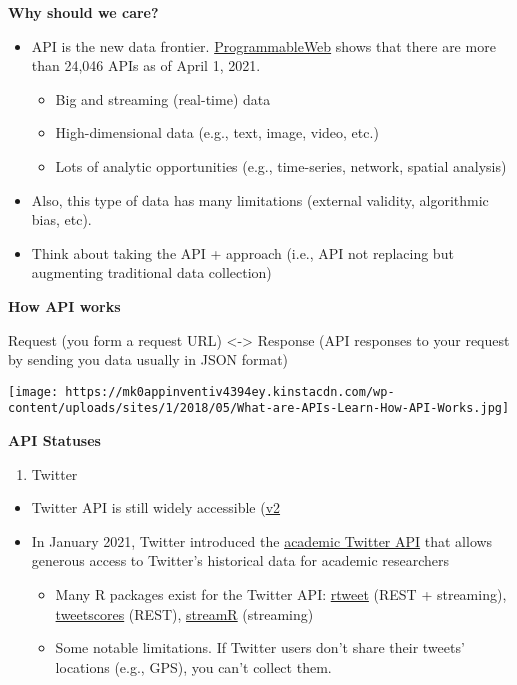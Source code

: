 \documentclass[
]{book}
\providecommand{\tightlist}{%
  \setlength{\itemsep}{0pt}\setlength{\parskip}{0pt}}
\begin{document}
\textbf{Why should we care?}

\begin{itemize}
\item
  API is the new data frontier. \href{https://www.programmableweb.com/apis/directory}{ProgrammableWeb} shows that there are more than 24,046 APIs as of April 1, 2021.

  \begin{itemize}
  \item
    Big and streaming (real-time) data
  \item
    High-dimensional data (e.g., text, image, video, etc.)
  \item
    Lots of analytic opportunities (e.g., time-series, network, spatial analysis)
  \end{itemize}
\item
  Also, this type of data has many limitations (external validity, algorithmic bias, etc).
\item
  Think about taking the API + approach (i.e., API not replacing but augmenting traditional data collection)
\end{itemize}

\textbf{How API works}

Request (you form a request URL) \textless-\textgreater{} Response (API responses to your request by sending you data usually in JSON format)

\texttt{[image: https://mk0appinventiv4394ey.kinstacdn.com/wp-content/uploads/sites/1/2018/05/What-are-APIs-Learn-How-API-Works.jpg]}

\textbf{API Statuses}

\begin{enumerate}
\def\labelenumi{\arabic{enumi}.}
\tightlist
\item
  Twitter
\end{enumerate}

\begin{itemize}
\item
  Twitter API is still widely accessible (\href{https://developer.twitter.com/en/docs/twitter-api/early-access}{v2}
\item
  In January 2021, Twitter introduced the \href{https://developer.twitter.com/en/solutions/academic-research}{academic Twitter API} that allows generous access to Twitter's historical data for academic researchers

  \begin{itemize}
  \item
    Many R packages exist for the Twitter API: \href{https://cran.r-project.org/web/packages/rtweet/rtweet.pdf}{rtweet} (REST + streaming), \href{https://github.com/pablobarbera/twitter_ideology/tree/master/pkg/tweetscores}{tweetscores} (REST), \href{https://github.com/pablobarbera/streamR}{streamR} (streaming)
  \item
    Some notable limitations. If Twitter users don't share their tweets' locations (e.g., GPS), you can't collect them.
  \end{itemize}
\end{itemize}
\end{document}

